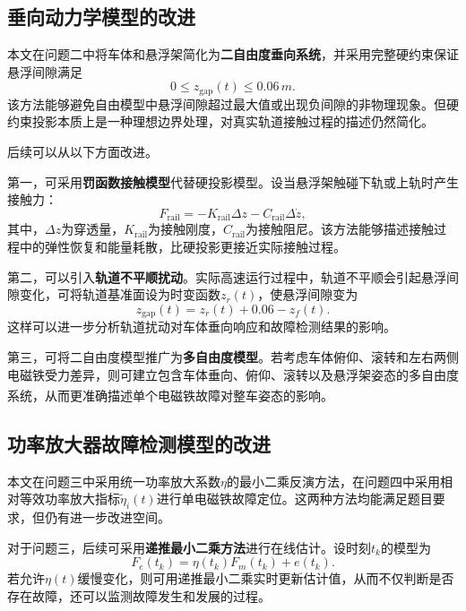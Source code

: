 \documentclass[a4paper]{nmmcm}
\newcommand{\upcite}[1]{\textsuperscript{\cite{#1}}}
\begin{document}
\subsection{垂向动力学模型的改进}

本文在问题二中将车体和悬浮架简化为\textbf{二自由度垂向系统}，并采用完整硬约束保证悬浮间隙满足
\begin{equation}
0\leq z_{\mathrm{gap}}(t)\leq 0.06\,m.
\end{equation}
该方法能够避免自由模型中悬浮间隙超过最大值或出现负间隙的非物理现象。但硬约束投影本质上是一种理想边界处理，对真实轨道接触过程的描述仍然简化。

后续可以从以下方面改进。

第一，可采用\textbf{罚函数接触模型}代替硬投影模型。设当悬浮架触碰下轨或上轨时产生接触力：
\begin{equation}
F_{\mathrm{rail}}=-K_{\mathrm{rail}}\Delta z-C_{\mathrm{rail}}\Delta\dot{z},
\end{equation}
其中，$\Delta z$为穿透量，$K_{\mathrm{rail}}$为接触刚度，$C_{\mathrm{rail}}$为接触阻尼。该方法能够描述接触过程中的弹性恢复和能量耗散，比硬投影更接近实际接触过程。

第二，可以引入\textbf{轨道不平顺扰动}。实际高速运行过程中，轨道不平顺会引起悬浮间隙变化，可将轨道基准面设为时变函数$z_r(t)$，使悬浮间隙变为
\begin{equation}
z_{\mathrm{gap}}(t)=z_r(t)+0.06-z_f(t).
\end{equation}
这样可以进一步分析轨道扰动对车体垂向响应和故障检测结果的影响。

第三，可将二自由度模型推广为\textbf{多自由度模型}。若考虑车体俯仰、滚转和左右两侧电磁铁受力差异，则可建立包含车体垂向、俯仰、滚转以及悬浮架姿态的多自由度系统，从而更准确描述单个电磁铁故障对整车姿态的影响\upcite{5}\upcite{6}。

\subsection{功率放大器故障检测模型的改进}

本文在问题三中采用统一功率放大系数$\eta$的最小二乘反演方法，在问题四中采用相对等效功率放大指标$\tilde{\eta}_i(t)$进行单电磁铁故障定位。这两种方法均能满足题目要求，但仍有进一步改进空间。

对于问题三，后续可采用\textbf{递推最小二乘方法}进行在线估计。设时刻$t_k$的模型为
\begin{equation}
F_e(t_k)=\eta(t_k)F_m(t_k)+e(t_k).
\end{equation}
若允许$\eta(t)$缓慢变化，则可用递推最小二乘实时更新估计值，从而不仅判断是否存在故障，还可以监测故障发生和发展的过程。
\end{document}
